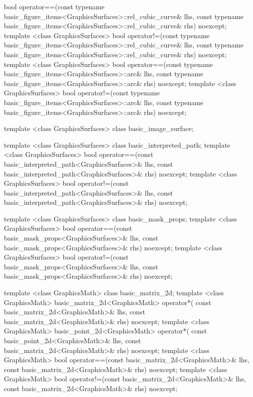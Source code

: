 \begin{codeblock}
{{{{    bool operator==(const typename 
      basic_figure_items<GraphicsSurfaces>::rel_cubic_curve& lhs,
      const typename basic_figure_items<GraphicsSurfaces>::rel_cubic_curve& 
      rhs) noexcept;
    template <class GraphicsSurfaces>
    bool operator!=(const typename 
      basic_figure_items<GraphicsSurfaces>::rel_cubic_curve& lhs,
      const typename basic_figure_items<GraphicsSurfaces>::rel_cubic_curve& 
      rhs) noexcept;
    template <class GraphicsSurfaces>
    bool operator==(const typename basic_figure_items<GraphicsSurfaces>::arc& 
      lhs, const typename basic_figure_items<GraphicsSurfaces>::arc& rhs) 
      noexcept;
    template <class GraphicsSurfaces>
    bool operator!=(const typename basic_figure_items<GraphicsSurfaces>::arc& 
      lhs, const typename basic_figure_items<GraphicsSurfaces>::arc& rhs) 
      noexcept;
    
    template <class GraphicsSurfaces>
    class basic_image_surface;
    
    template <class GraphicsSurfaces>
    class basic_interpreted_path;
    template <class GraphicsSurfaces>
    bool operator==(const basic_interpreted_path<GraphicsSurfaces>& lhs,
      const basic_interpreted_path<GraphicsSurfaces>& rhs) noexcept;
    template <class GraphicsSurfaces>
    bool operator!=(const basic_interpreted_path<GraphicsSurfaces>& lhs,
      const basic_interpreted_path<GraphicsSurfaces>& rhs) noexcept;
    
    
    template <class GraphicsSurfaces>
    class basic_mask_props;
    template <class GraphicsSurfaces>
    bool operator==(const basic_mask_props<GraphicsSurfaces>& lhs,
      const basic_mask_props<GraphicsSurfaces>& rhs) noexcept;
    template <class GraphicsSurfaces>
    bool operator!=(const basic_mask_props<GraphicsSurfaces>& lhs,
      const basic_mask_props<GraphicsSurfaces>& rhs) noexcept;
    
    template <class GraphicsMath>
    class basic_matrix_2d;
    template <class GraphicsMath>
    basic_matrix_2d<GraphicsMath> operator*(
      const basic_matrix_2d<GraphicsMath>& lhs,
      const basic_matrix_2d<GraphicsMath>& rhs) noexcept;
    template <class GraphicsMath>
    basic_point_2d<GraphicsMath> operator*(
      const basic_point_2d<GraphicsMath>& lhs,
      const basic_matrix_2d<GraphicsMath>& rhs) noexcept;
    template <class GraphicsMath>
    bool operator==(const basic_matrix_2d<GraphicsMath>& lhs,
      const basic_matrix_2d<GraphicsMath>& rhs) noexcept;
    template <class GraphicsMath>
    bool operator!=(const basic_matrix_2d<GraphicsMath>& lhs,
      const basic_matrix_2d<GraphicsMath>& rhs) noexcept;
  
}}}}
\end{codeblock}
